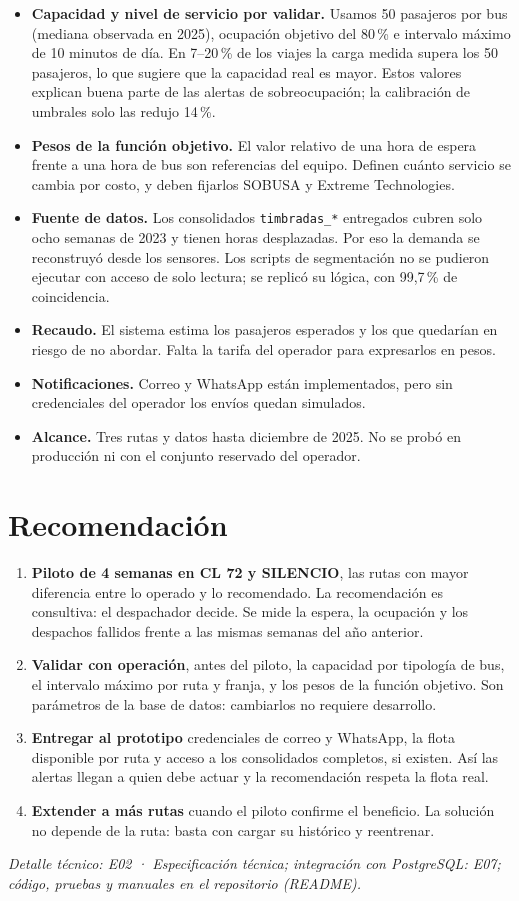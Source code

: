 \documentclass[11pt,a4paper]{article}
\begin{document}
\begin{itemize}
  \setlength{\itemsep}{0.15em}
  \item \textbf{Capacidad y nivel de servicio por validar.} Usamos 50 pasajeros por bus (mediana observada en 2025), ocupación objetivo del 80\,\% e intervalo máximo de 10 minutos de día. En 7--20\,\% de los viajes la carga medida supera los 50 pasajeros, lo que sugiere que la capacidad real es mayor. Estos valores explican buena parte de las alertas de sobreocupación; la calibración de umbrales solo las redujo 14\,\%.
  \item \textbf{Pesos de la función objetivo.} El valor relativo de una hora de espera frente a una hora de bus son referencias del equipo. Definen cuánto servicio se cambia por costo, y deben fijarlos SOBUSA y Extreme Technologies.
  \item \textbf{Fuente de datos.} Los consolidados \texttt{timbradas\_*} entregados cubren solo ocho semanas de 2023 y tienen horas desplazadas. Por eso la demanda se reconstruyó desde los sensores. Los scripts de segmentación no se pudieron ejecutar con acceso de solo lectura; se replicó su lógica, con 99,7\,\% de coincidencia.
  \item \textbf{Recaudo.} El sistema estima los pasajeros esperados y los que quedarían en riesgo de no abordar. Falta la tarifa del operador para expresarlos en pesos.
  \item \textbf{Notificaciones.} Correo y WhatsApp están implementados, pero sin credenciales del operador los envíos quedan simulados.
  \item \textbf{Alcance.} Tres rutas y datos hasta diciembre de 2025. No se probó en producción ni con el conjunto reservado del operador.
\end{itemize}

\section*{Recomendación}

\begin{enumerate}
  \setlength{\itemsep}{0.15em}
  \item \textbf{Piloto de 4 semanas en CL 72 y SILENCIO}, las rutas con mayor diferencia entre lo operado y lo recomendado. La recomendación es consultiva: el despachador decide. Se mide la espera, la ocupación y los despachos fallidos frente a las mismas semanas del año anterior.
  \item \textbf{Validar con operación}, antes del piloto, la capacidad por tipología de bus, el intervalo máximo por ruta y franja, y los pesos de la función objetivo. Son parámetros de la base de datos: cambiarlos no requiere desarrollo.
  \item \textbf{Entregar al prototipo} credenciales de correo y WhatsApp, la flota disponible por ruta y acceso a los consolidados completos, si existen. Así las alertas llegan a quien debe actuar y la recomendación respeta la flota real.
  \item \textbf{Extender a más rutas} cuando el piloto confirme el beneficio. La solución no depende de la ruta: basta con cargar su histórico y reentrenar.
\end{enumerate}

\vfill
\small\textit{Detalle técnico: E02 · Especificación técnica; integración con PostgreSQL: E07; código, pruebas y manuales en el repositorio (README).}
\end{document}
